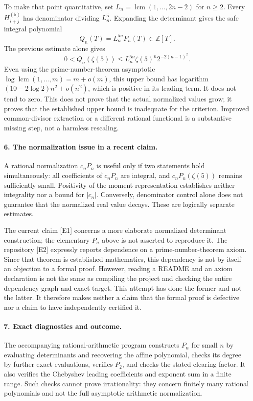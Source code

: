\documentclass[11pt]{article}
\begin{document}
To make that point quantitative, set $L_n=\operatorname{lcm}(1,\ldots,2n-2)$ for $n\geq2$. Every $H_{i+j}^{(5)}$ has denominator dividing $L_n^5$. Expanding the determinant gives the safe integral polynomial
\[
 Q_n(T)=L_n^{5n}P_n(T)\in\mathbb Z[T].
\]
The previous estimate alone gives
\[
 0<Q_n(\zeta(5))
 \leq L_n^{5n}\zeta(5)^n2^{-2(n-1)^2}.
\]
Even using the prime-number-theorem asymptotic $\log\operatorname{lcm}(1,\ldots,m)=m+o(m)$, this upper bound has logarithm $(10-2\log2)n^2+o(n^2)$, which is positive in its leading term. It does not tend to zero. This does not prove that the actual normalized values grow; it proves that the established upper bound is inadequate for the criterion. Improved common-divisor extraction or a different rational functional is a substantive missing step, not a harmless rescaling.

\paragraph{6. The normalization issue in a recent claim.}
A rational normalization $c_nP_n$ is useful only if two statements hold simultaneously: all coefficients of $c_nP_n$ are integral, and $c_nP_n(\zeta(5))$ remains sufficiently small. Positivity of the moment representation establishes neither integrality nor a bound for $|c_n|$. Conversely, denominator control alone does not guarantee that the normalized real value decays. These are logically separate estimates.

The current claim [E1] concerns a more elaborate normalized determinant construction; the elementary $P_n$ above is not asserted to reproduce it. The repository [E2] expressly reports dependence on a prime-number-theorem axiom. Since that theorem is established mathematics, this dependency is not by itself an objection to a formal proof. However, reading a README and an axiom declaration is not the same as compiling the project and checking the entire dependency graph and exact target. This attempt has done the former and not the latter. It therefore makes neither a claim that the formal proof is defective nor a claim to have independently certified it.

\paragraph{7. Exact diagnostics and outcome.}
The accompanying rational-arithmetic program constructs $P_n$ for small $n$ by evaluating determinants and recovering the affine polynomial, checks its degree by further exact evaluations, verifies $P_2$, and checks the stated clearing factor. It also verifies the Chebyshev leading coefficients and exponent sum in a finite range. Such checks cannot prove irrationality: they concern finitely many rational polynomials and not the full asymptotic arithmetic normalization.
\end{document}
